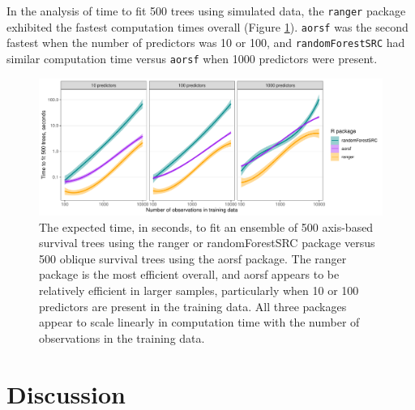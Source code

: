 \documentclass[12pt]{article}\usepackage[]{graphicx}\usepackage[]{xcolor}
\makeatletter
\def\maxwidth{ %
  \ifdim\Gin@nat@width>\linewidth
    \linewidth
  \else
    \Gin@nat@width
  \fi
}
\newenvironment{knitrout}{}{} %
\makeatother
\begin{document}
In the analysis of time to fit 500 trees using simulated data, the \texttt{ranger} package exhibited the fastest computation times overall (Figure \ref{fig:bm_time_viz}). \texttt{aorsf} was the second fastest when the number of predictors was 10 or 100,  and \texttt{randomForestSRC} had similar computation time versus \texttt{aorsf} when 1000 predictors were present.

\begin{knitrout}
\color{fgcolor}\begin{figure}
\includegraphics[width=\maxwidth]{figure/bm_time_viz-1} \caption[The expected time, in seconds, to fit an ensemble of 500 axis-based survival trees using the ranger or randomForestSRC package versus 500 oblique survival trees using the aorsf package]{The expected time, in seconds, to fit an ensemble of 500 axis-based survival trees using the ranger or randomForestSRC package versus 500 oblique survival trees using the aorsf package. The ranger package is the most efficient overall, and aorsf appears to be relatively efficient in larger samples, particularly when 10 or 100 predictors are present in the training data. All three packages appear to scale linearly in computation time with the number of observations in the training data.}\label{fig:bm_time_viz}
\end{figure}

\end{knitrout}


\section{Discussion} \label{sec:discussion}
\end{document}
